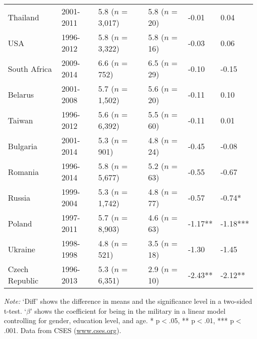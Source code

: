 \begin{table}[!h]
{\begin{threeparttable}
\begin{tabular}[t]{llllll}
Thailand & 2001-2011 & 5.8 ($n$ = 3,017) & 5.8 ($n$ = 20) & -0.01 & 0.04\\
USA & 1996-2012 & 5.8 ($n$ = 3,322) & 5.8 ($n$ = 16) & -0.03 & 0.06\\
South Africa & 2009-2014 & 6.6 ($n$ = 752) & 6.5 ($n$ = 29) & -0.10 & -0.15\\
Belarus & 2001-2008 & 5.7 ($n$ = 1,502) & 5.6 ($n$ = 20) & -0.11 & 0.10\\
Taiwan & 1996-2012 & 5.6 ($n$ = 6,392) & 5.5 ($n$ = 60) & -0.11 & 0.01\\
Bulgaria & 2001-2014 & 5.3 ($n$ = 901) & 4.8 ($n$ = 24) & -0.45 & -0.08\\
Romania & 1996-2014 & 5.8 ($n$ = 5,677) & 5.2 ($n$ = 63) & -0.55 & -0.67\\
Russia & 1999-2004 & 5.3 ($n$ = 1,742) & 4.8 ($n$ = 77) & -0.57 & -0.74*\\
Poland & 1997-2011 & 5.7 ($n$ = 8,903) & 4.6 ($n$ = 63) & -1.17** & -1.18***\\
Ukraine & 1998-1998 & 4.8 ($n$ = 521) & 3.5 ($n$ = 18) & -1.30 & -1.45\\
Czech Republic & 1996-2013 & 5.3 ($n$ = 6,351) & 2.9 ($n$ = 10) & -2.43** & -2.12**\\
\bottomrule
\end{tabular}
\begin{tablenotes}[para]
\item \textit{Note:} `Diff' shows the difference in means and the significance level in a two-sided t-test. `$\beta$' shows the coefficient for being in the military in a linear model controlling for gender, education level, and age. * p$<$.05, ** p$<$.01, *** p$<$.001. Data from CSES (\href{www.cses.org}{www.cses.org}).
\end{tablenotes}
\end{threeparttable}}
\end{table}
